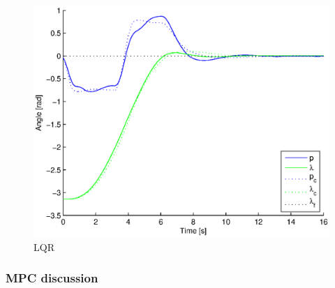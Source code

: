 \begin{figure}[hp]
	\centering
		\includegraphics[width=1.00\textwidth]{figures/3/lqr.eps}
	\caption{LQR}
	\label{fig:lqr}
\end{figure}

\subsubsection{MPC discussion}


